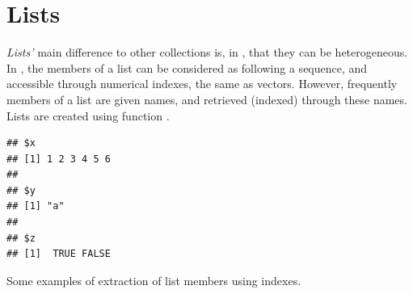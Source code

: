 \documentclass[krantz2]{krantz}\usepackage{knitr}%
\begin{document}

\section{Lists}\label{sec:calc:lists}
\emph{Lists'} main difference to other collections is, in \Rlang, that they can be heterogeneous. In \Rlang, the members of a list can be considered as following a sequence, and accessible through numerical indexes, the same as vectors. However, frequently members of a list are given names, and retrieved (indexed) through these names. Lists are created using function .

\begin{knitrout}\footnotesize
{}\color{fgcolor}\begin{kframe}
\begin{alltt}
 \hlkwb{<-} \hlstd{(} \hlstd{=} \hlopt{:}\hlstd{,}  \hlstd{=} \hlstd{,}  \hlstd{=} \hlstd{(}\hlstd{,} \hlstd{))}
\end{alltt}
\begin{verbatim}
## $x
## [1] 1 2 3 4 5 6
## 
## $y
## [1] "a"
## 
## $z
## [1]  TRUE FALSE
\end{verbatim}
\end{kframe}
\end{knitrout}

Some examples of extraction of list members using indexes.
\end{document}
